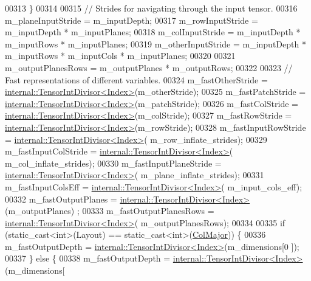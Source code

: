 \begin{DoxyCode}
00313     \}
00314 
00315     \textcolor{comment}{// Strides for navigating through the input tensor.}
00316     m\_planeInputStride = m\_inputDepth;
00317     m\_rowInputStride = m\_inputDepth * m\_inputPlanes;
00318     m\_colInputStride = m\_inputDepth * m\_inputRows * m\_inputPlanes;
00319     m\_otherInputStride = m\_inputDepth * m\_inputRows * m\_inputCols * m\_inputPlanes;
00320 
00321     m\_outputPlanesRows = m\_outputPlanes * m\_outputRows;
00322 
00323     \textcolor{comment}{// Fast representations of different variables.}
00324     m\_fastOtherStride = \hyperlink{struct_eigen_1_1internal_1_1_tensor_int_divisor}{internal::TensorIntDivisor<Index>}(m\_otherStride);
00325     m\_fastPatchStride = \hyperlink{struct_eigen_1_1internal_1_1_tensor_int_divisor}{internal::TensorIntDivisor<Index>}(m\_patchStride);
00326     m\_fastColStride = \hyperlink{struct_eigen_1_1internal_1_1_tensor_int_divisor}{internal::TensorIntDivisor<Index>}(m\_colStride);
00327     m\_fastRowStride = \hyperlink{struct_eigen_1_1internal_1_1_tensor_int_divisor}{internal::TensorIntDivisor<Index>}(m\_rowStride);
00328     m\_fastInputRowStride = \hyperlink{struct_eigen_1_1internal_1_1_tensor_int_divisor}{internal::TensorIntDivisor<Index>}(
      m\_row\_inflate\_strides);
00329     m\_fastInputColStride = \hyperlink{struct_eigen_1_1internal_1_1_tensor_int_divisor}{internal::TensorIntDivisor<Index>}(
      m\_col\_inflate\_strides);
00330     m\_fastInputPlaneStride = \hyperlink{struct_eigen_1_1internal_1_1_tensor_int_divisor}{internal::TensorIntDivisor<Index>}(
      m\_plane\_inflate\_strides);
00331     m\_fastInputColsEff = \hyperlink{struct_eigen_1_1internal_1_1_tensor_int_divisor}{internal::TensorIntDivisor<Index>}(
      m\_input\_cols\_eff);
00332     m\_fastOutputPlanes = \hyperlink{struct_eigen_1_1internal_1_1_tensor_int_divisor}{internal::TensorIntDivisor<Index>}(m\_outputPlanes)
      ;
00333     m\_fastOutputPlanesRows = \hyperlink{struct_eigen_1_1internal_1_1_tensor_int_divisor}{internal::TensorIntDivisor<Index>}(
      m\_outputPlanesRows);
00334 
00335     \textcolor{keywordflow}{if} (static\_cast<int>(Layout) == \textcolor{keyword}{static\_cast<}\textcolor{keywordtype}{int}\textcolor{keyword}{>}(\hyperlink{group__enums_ggaacded1a18ae58b0f554751f6cdf9eb13a0cbd4bdd0abcfc0224c5fcb5e4f6669a}{ColMajor})) \{
00336       m\_fastOutputDepth = \hyperlink{struct_eigen_1_1internal_1_1_tensor_int_divisor}{internal::TensorIntDivisor<Index>}(m\_dimensions[0
      ]);
00337     \} \textcolor{keywordflow}{else} \{
00338       m\_fastOutputDepth = \hyperlink{struct_eigen_1_1internal_1_1_tensor_int_divisor}{internal::TensorIntDivisor<Index>}(m\_dimensions[

\end{DoxyCode}
